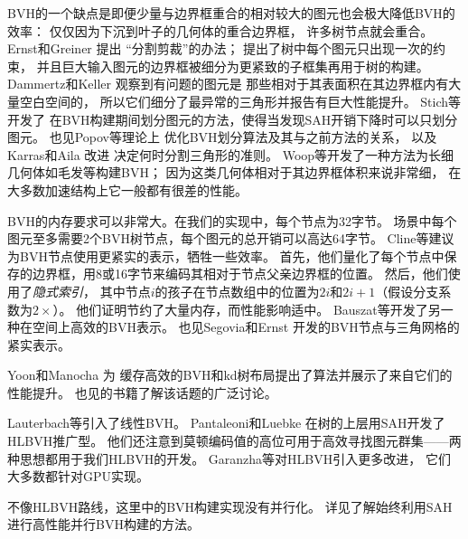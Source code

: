 BVH的一个缺点是即便少量与边界框重合的相对较大的图元也会极大降低BVH的效率：
仅仅因为下沉到叶子的几何体的重合边界框，
许多树节点就会重合。Ernst和Greiner \parencite*{4342593}提出
“分割剪裁”的办法；
提出了树中每个图元只出现一次的约束，
并且巨大输入图元的边界框被细分为更紧致的子框集再用于树的构建。
Dammertz和Keller \parencite*{4634636}观察到有问题的图元是
那些相对于其表面积在其边界框内有大量空白空间的，
所以它们细分了最异常的三角形并报告有巨大性能提升。
Stich等\parencite*{10.1145/1572769.1572771}开发了
在BVH构建期间划分图元的方法，使得当发现SAH开销下降时可以只划分图元。
也见Popov等\parencite*{10.1145/1572769.1572772}理论上
优化BVH划分算法及其与之前方法的关系，
以及Karras和Aila \parencite*{10.1145/2492045.2492055}改进
决定何时分割三角形的准则。
Woop等\parencite*{10.5555/2980009.2980014}开发了一种方法为长细几何体如毛发等构建BVH；
因为这类几何体相对于其边界框体积来说非常细，
在大多数加速结构上它一般都有很差的性能。

BVH的内存要求可以非常大。在我们的实现中，每个节点为32字节。
场景中每个图元至多需要2个BVH树节点，每个图元的总开销可以高达64字节。
Cline等\parencite*{10.5555/2383894.2383909}建议为BVH节点使用更紧实的表示，牺牲一些效率。
首先，他们量化了每个节点中保存的边界框，用8或16字节来编码其相对于节点父亲边界框的位置。
然后，他们使用了{\itshape 隐式索引}，
其中节点$i$的孩子在节点数组中的位置为$2i$和$2i+1$（假设分支系数为$2\times$）。
他们证明节约了大量内存，而性能影响适中。
Bauszat等\parencite*{10.2312:PE:VMV:VMV10:227-234}开发了另一种在空间上高效的BVH表示。
也见Segovia和Ernst \parencite*{10.5555/1839214.1839242}开发的BVH节点与三角网格的紧实表示。

Yoon和Manocha \parencite*{10.1111/j.1467-8659.2006.00970.x}为
缓存高效的BVH和kd树布局提出了算法并展示了来自它们的性能提升。
也见\citet{10.5555/1121584}的书籍了解该话题的广泛讨论。

Lauterbach等\parencite*{10.1111/j.1467-8659.2009.01377.x}引入了线性BVH。
Pantaleoni和Luebke \parencite*{10.5555/1921479.1921493}在树的上层用SAH开发了HLBVH推广型。
他们还注意到莫顿编码值的高位可用于高效寻找图元群集——两种思想都用于我们HLBVH的开发。
Garanzha等\parencite*{10.1145/2018323.2018333}对HLBVH引入更多改进，
它们大多数都针对GPU实现。

不像HLBVH路线，这里中的BVH构建实现没有并行化。
详见\citet{5669303}了解始终利用SAH进行高性能并行BVH构建的方法。

